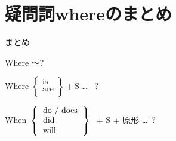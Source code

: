 \documentclass[aspectratio=169,xcolor={dvipsnames,table}]{beamer}
\begin{document}
\section{疑問詞whereのまとめ}
\begin{frame}[plain]{まとめ}
 \begin{block}{Where ～?}
\begin{description}[　　　　]
 \item[be動詞] %
Where $\left\{
\begin{array}{l}
 \text{is}\\
 \text{are}\\
\end{array}
\right\} + \text{S}$ \ldots\,\,\, ?
 \item[一般動詞] When\,\,\,$\left\{ \begin{tabular}{l}
	  do / does\\
	  did\\
	  will\\
	 \end{tabular}\right\}$%
\,\,$+$ S $+$ 原形 \ldots\,\,\,?
\end{description}
  
 \end{block}
\end{frame}
\end{document}
